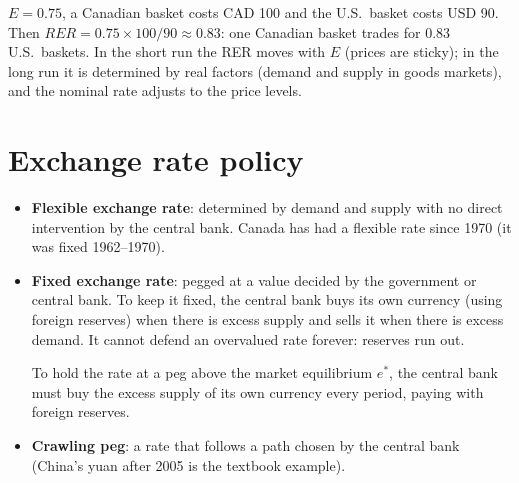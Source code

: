 \begin{example}
$E = 0.75$, a Canadian basket costs CAD 100 and the U.S.\ basket costs USD 90. Then
$RER = 0.75 \times 100/90 \approx 0.83$: one Canadian basket trades for 0.83 U.S.\ baskets.
In the short run the RER moves with $E$ (prices are sticky); in the long run it is
determined by real factors (demand and supply in goods markets), and the nominal rate
adjusts to the price levels.
\end{example}

\section{Exchange rate policy}

\begin{itemize}
  \item \textbf{Flexible exchange rate}: determined by demand and supply with no direct
        intervention by the central bank. Canada has had a flexible rate since 1970 (it
        was fixed 1962--1970).
  \item \textbf{Fixed exchange rate}: pegged at a value decided by the government or
        central bank. To keep it fixed, the central bank buys its own currency (using
        foreign reserves) when there is excess supply and sells it when there is excess
        demand. It cannot defend an overvalued rate forever: reserves run out.

\begin{center}
\end{center}
To hold the rate at a peg above the market equilibrium $e^{*}$, the central bank must buy
the excess supply of its own currency every period, paying with foreign reserves.
  \item \textbf{Crawling peg}: a rate that follows a path chosen by the central bank
        (China's yuan after 2005 is the textbook example).
\end{itemize}

